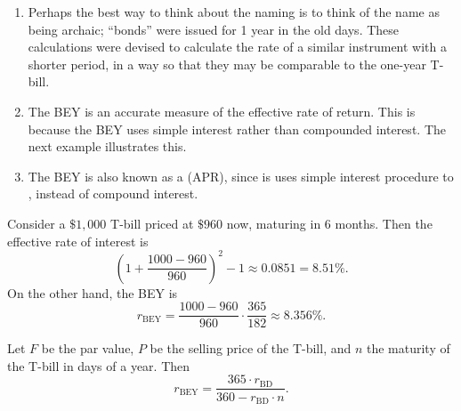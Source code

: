 \documentclass[notoc,notitlepage]{tufte-book}
\DeclareMathOperator{\BEY}{BEY}
\DeclareMathOperator{\BD}{BD}
\begin{document}
\begin{remark}
  \begin{enumerate}
    \item Perhaps the best way to think about the naming is to
      think of the name as being archaic; ``bonds'' were issued for 1 year
      in the old days. These calculations were devised
      to calculate the rate of a similar instrument with a shorter period,
      in a way so that they may be comparable to the one-year T-bill.
    \item The BEY is  an accurate measure
      of the effective rate of return.
      This is because the BEY uses simple interest
      rather than compounded interest.
      The next example illustrates this.
    \item The BEY is also known as a  (APR),
      since is uses simple interest procedure to ,
      instead of compound interest.
  \end{enumerate}
\end{remark}

\begin{eg}
  Consider a $\$1,000$ T-bill priced at $\$960$ now,
  maturing in 6 months.
  Then the effective rate of interest is
  \begin{equation*}
    \left(1 + \frac{1000 - 960}{960}\right)^2 - 1 \approx 0.0851 = 8.51\%.
  \end{equation*}
  On the other hand, the BEY is
  \begin{equation*}
    r_{\BEY} = \frac{1000 - 960}{960} \cdot \frac{365}{182}
          \approx 8.356\%.
  \end{equation*}
\end{eg}

\begin{propo}\label{propo:relationship_between_bey_and_bd}
  Let $F$ be the par value, $P$ be the selling price of the T-bill,
  and $n$ the maturity of the T-bill in days of a year.
  Then
  \begin{equation*}
    r_{\BEY} = \frac{365 \cdot r_{\BD}}{360 - r_{\BD} \cdot n}.
  \end{equation*}
\end{propo}
\end{document}
